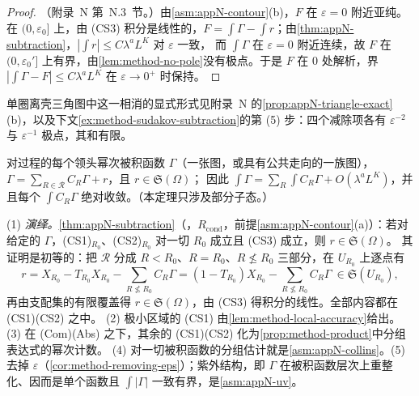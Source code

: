 \begin{proof}
（附录~N 第~N.3~节。）由\cref{asm:appN-contour}(b)，$F$ 在 $\varepsilon=0$ 附近亚纯。在 $(0,\varepsilon_0]$ 上，由 (CS3) 积分是线性的，$F=\int\Gamma-\int r$；由\cref{thm:appN-subtraction}，$|\int r|\le C\lambda^aL^K$ 对 $\varepsilon$ 一致，
而 $\int\Gamma$ 在 $\varepsilon=0$ 附近连续，故 $F$ 在 $(0,\varepsilon_0']$ 上有界，由\cref{lem:method-no-pole}没有极点。于是 $F$ 在 $0$ 处解析，界 $|\int\Gamma-F|\le C\lambda^aL^K$ 在 $\varepsilon\to0^+$ 时保持。
\end{proof}

单圈离壳三角图中这一相消的显式形式见附录~N 的\cref{prop:appN-triangle-exact}(b)，以及下文\cref{ex:method-sudakov-subtraction}的第 (5) 步：四个减除项各有 $\varepsilon^{-2}$ 与 $\varepsilon^{-1}$ 极点，其和有限。

\begin{theorem}\label{thm:method-subtraction}
对过程的每个领头幂次被积函数 $\Gamma$（一张图，或具有公共走向的一族图），$\Gamma=\sum_{R\in\mathcal R}C_R\Gamma+r$，且 $r\in\mathfrak S(\Omega)$；
因此 $\int\Gamma=\sum_R\int C_R\Gamma+O(\lambda^aL^K)$，并且每个 $\int C_R\Gamma$ 绝对收敛。（本定理只涉及部分子态。）
\end{theorem}

\begin{proofsketch}
(1) \emph{演绎。}\cref{thm:appN-subtraction}（\tagR，$R_{\mathrm{cond}}$，前提\cref{asm:appN-contour}(a)）：若对给定的 $\Gamma$，(CS1)$_{R_0}$、(CS2)$_{R_0}$ 对一切 $R_0$ 成立且 (CS3) 成立，则 $r\in\mathfrak S(\Omega)$。
其证明是初等的：把 $\mathcal R$ 分成 $R<R_0$、$R=R_0$、$R\not\le R_0$ 三部分，在 $U_{R_0}$ 上逐点有
\begin{equation}\label{eq:method-r-identity}
r=X_{R_0}-T_{R_0}X_{R_0}-\sum_{R\not\le R_0}C_R\Gamma=(1-T_{R_0})X_{R_0}-\sum_{R\not\le R_0}C_R\Gamma\ \in\mathfrak S(U_{R_0}) ,
\end{equation}
再由支配集的有限覆盖得 $r\in\mathfrak S(\Omega)$，由 (CS3) 得积分的线性。全部内容都在 (CS1)(CS2) 之中。
(2) 极小区域的 (CS1) 由\cref{lem:method-local-accuracy}给出。(3) 在 (Com)(Abs) 之下，其余的 (CS1)(CS2) 化为\cref{prop:method-product}中分组表达式的幂次计数。
(4) 对一切被积函数的分组估计就是\cref{asm:appN-collins}。(5) 去掉 $\varepsilon$（\cref{cor:method-removing-eps}）；紫外结构，即 $\Gamma$ 在被积函数层次上重整化、因而是单个函数且 $\int|\Gamma|$ 一致有界，是\cref{asm:appN-uv}。
\end{proofsketch}

